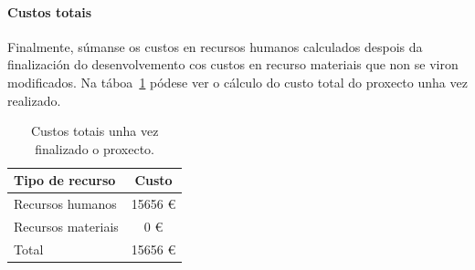 \paragraph{Custos totais}
Finalmente, súmanse os custos en recursos humanos calculados despois da finalización do desenvolvemento cos custos en recurso materiais que non se viron modificados. Na táboa~\ref{tab:custoTotal} pódese ver o cálculo do custo total do proxecto unha vez realizado.

\begin{table} [tbh]
	\footnotesize
	\centering
	\begin{tabular}{|l|c|}
		\hline 
		\textbf{Tipo de recurso} & \textbf{Custo} \\ 
		\hline 
		Recursos humanos & 15656 € \\ 
		\hline 
		Recursos materiais & 0 € \\ 
		\hline 
		Total & 15656 € \\ 
		\hline 
	\end{tabular}
	\caption{Custos totais unha vez finalizado o proxecto.}
	\label{tab:custoTotal}
\end{table}
